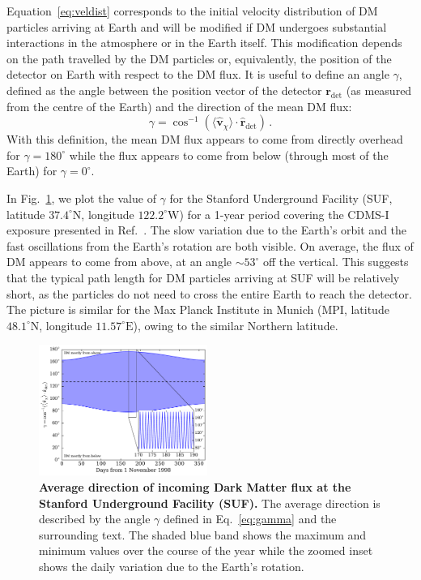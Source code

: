 \documentclass[prd,twocolumn,showpacs,nofootinbib,aps]{revtex4-1}
\begin{document}
Equation~\eqref{eq:veldist} corresponds to the initial velocity distribution of DM particles arriving at Earth and will be modified if DM undergoes substantial interactions in the atmosphere or in the Earth itself. This modification depends on the path travelled by the DM particles or, equivalently, the position of the detector on Earth with respect to the DM flux. It is useful to define an angle $\gamma$, defined as the angle between the position vector of the detector $\mathbf{r}_\mathrm{det}$ (as measured from the centre of the Earth) and the direction of the mean DM flux:
\begin{equation}
\label{eq:gamma}
\gamma = \cos^{-1}\left(\langle \hat{\mathbf{v}}_\chi\rangle \cdot \hat{\mathbf{r}}_\mathrm{det}\right)\,.
\end{equation}
With this definition, the mean DM flux appears to come from directly overhead for $\gamma = 180^\circ$ while the flux appears to come from below (through most of the Earth) for $\gamma = 0^\circ$. 

In Fig.~\ref{fig:gamma}, we plot the value of $\gamma$ for the Stanford Underground Facility (SUF, latitude $37.4^\circ \mathrm{N}$, longitude $122.2^\circ \mathrm{W}$) for a 1-year period covering the CDMS-I exposure presented in Ref.~\cite{Abusaidi:2000wg,Abrams:2002nb}. The slow variation due to the Earth's orbit and the fast oscillations from the Earth's rotation are both visible. On average, the flux of DM appears to come from above, at an angle $\sim 53^\circ$ off the vertical. This suggests that the typical path length for DM particles arriving at SUF will be relatively short, as the particles do not need to cross the entire Earth to reach the detector. The picture is similar for the Max Planck Institute in Munich (MPI, latitude $48.1^\circ \mathrm{N}$, longitude $11.57^\circ \mathrm{E}$), owing to the similar Northern latitude.

\begin{figure}[t]
\centering
\includegraphics[width=0.49\textwidth,]{plots/Gamma_SUF.pdf}
\caption{\textbf{Average direction of incoming Dark Matter flux at the Stanford Underground Facility (SUF).}  The average direction is described by the angle $\gamma$ defined in Eq.~\eqref{eq:gamma} and the surrounding text. The shaded blue band shows the maximum and minimum values over the course of the year while the zoomed inset shows the daily variation due to the Earth's rotation.}
\label{fig:gamma}
\end{figure}
\end{document}
